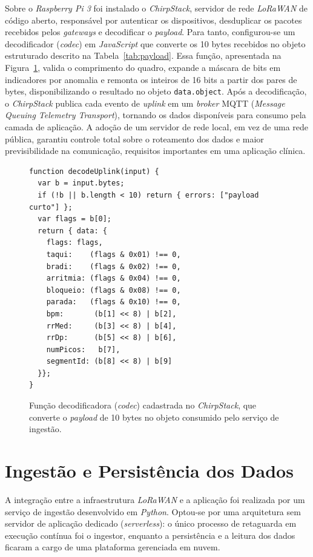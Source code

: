 Sobre o \textit{Raspberry Pi 3} foi instalado o \textit{ChirpStack}, servidor de rede \textit{LoRaWAN} de código aberto, responsável por autenticar os dispositivos, desduplicar os pacotes recebidos pelos \textit{gateways} e decodificar o \textit{payload}. Para tanto, configurou-se um decodificador (\textit{codec}) em \textit{JavaScript} que converte os 10 bytes recebidos no objeto estruturado descrito na Tabela~\ref{tab:payload}. Essa função, apresentada na Figura~\ref{fig:decoder}, valida o comprimento do quadro, expande a máscara de bits em indicadores por anomalia e remonta os inteiros de 16 bits a partir dos pares de bytes, disponibilizando o resultado no objeto \texttt{data.object}. Após a decodificação, o \textit{ChirpStack} publica cada evento de \textit{uplink} em um \textit{broker} \acs{MQTT} (\textit{Message Queuing Telemetry Transport}), tornando os dados disponíveis para consumo pela camada de aplicação. A adoção de um servidor de rede local, em vez de uma rede pública, garantiu controle total sobre o roteamento dos dados e maior previsibilidade na comunicação, requisitos importantes em uma aplicação clínica.

\begin{figure}[ht]
\centering
\begin{Verbatim}[fontsize=\small, frame=single]
function decodeUplink(input) {
  var b = input.bytes;
  if (!b || b.length < 10) return { errors: ["payload curto"] };
  var flags = b[0];
  return { data: {
    flags: flags,
    taqui:    (flags & 0x01) !== 0,
    bradi:    (flags & 0x02) !== 0,
    arritmia: (flags & 0x04) !== 0,
    bloqueio: (flags & 0x08) !== 0,
    parada:   (flags & 0x10) !== 0,
    bpm:       (b[1] << 8) | b[2],
    rrMed:     (b[3] << 8) | b[4],
    rrDp:      (b[5] << 8) | b[6],
    numPicos:   b[7],
    segmentId: (b[8] << 8) | b[9]
  }};
}
\end{Verbatim}
\caption{Função decodificadora (\textit{codec}) cadastrada no \textit{ChirpStack}, que converte o \textit{payload} de 10 bytes no objeto consumido pelo serviço de ingestão.}
\label{fig:decoder}
\end{figure}


\section{Ingestão e Persistência dos Dados}
\label{sec:ingestao}

A integração entre a infraestrutura \textit{LoRaWAN} e a aplicação foi realizada por um serviço de ingestão desenvolvido em \textit{Python}. Optou-se por uma arquitetura sem servidor de aplicação dedicado (\textit{serverless}): o único processo de retaguarda em execução contínua foi o ingestor, enquanto a persistência e a leitura dos dados ficaram a cargo de uma plataforma gerenciada em nuvem.

